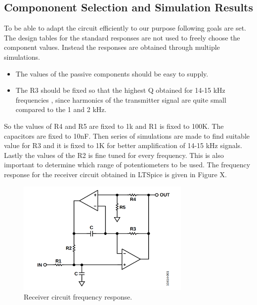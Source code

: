 \documentclass[letterpaper,12pt]{article}
\begin{document}
\subsection{Compononent Selection and Simulation Results}
To be able to adapt the circuit efficiently to our purpose following goals are set. The design tables for the standard responses are not used to freely choose the component values. Instead the responses are obtained through multiple simulations.
\begin{itemize}
    \item The values of the passive components should be easy to supply.
    \item The R3 should be fixed so that the highest Q obtained for 14-15 kHz frequencies , since harmonics of the transmitter signal are quite small compared to the 1 and 2 kHz.
\end{itemize}
So the values of R4 and R5 are fixed to 1k and R1 is fixed to 100K. The capacitors are fixed to 10nF. Then series of simulations are made to find suitable value for R3 and it is fixed to 1K for better amplification of 14-15 kHz signals. Lastly the values of the R2 is fine tuned for every frequency. This is also important to determine which range of potentiometers to be used. The frequency response for the receiver circuit obtained in LTSpice is given in Figure X.
\begin{figure}[H]
    \centering
    \includegraphics[width = 0.75\textwidth]{dualopamp.png}
    \caption{Receiver circuit frequency response.}
\end{figure}
\end{document}
